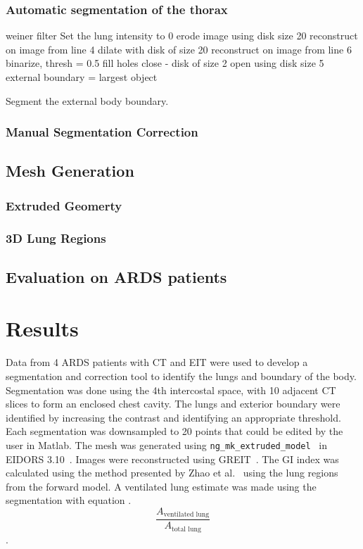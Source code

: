 \subsubsection{Automatic segmentation of the thorax}
\begin{algorithm}[H]
	\SetAlgoLined
		weiner filter\;
		Set the lung intensity to 0\;
		erode image using disk size 20\;
		reconstruct on image from line 4\;
		dilate with disk of size 20\;
		reconstruct on image from line 6\;
		binarize, thresh = 0.5\;
		fill holes\;
		close - disk of size 2\;
		open using disk size 5\;
		external boundary = largest object\;
	\caption{Segment the external body boundary.}
\end{algorithm}

\subsubsection{Manual Segmentation Correction}

\subsection{Mesh Generation}
\subsubsection{Extruded Geomerty}
\subsubsection{3D Lung Regions}

\subsection{Evaluation on ARDS patients}

\section{Results}
Data from 4 ARDS patients with CT
and EIT were used to develop a segmentation 
and correction tool to identify 
the lungs and boundary of the body.  
Segmentation was done using the 4th intercostal space, 
with 10 adjacent CT 
slices to form an enclosed chest cavity. 
The lungs
and exterior boundary were identified by increasing the contrast
and identifying an appropriate threshold.
Each segmentation was downsampled to
20 points that could be edited by the user in Matlab. The 
mesh was generated using 
\verb!ng_mk_extruded_model!~\cite{Grychtol2012} in EIDORS 
3.10~\cite{Adler2019}. Images were reconstructed 
using GREIT~\cite{Adler2009}. 
The GI index was calculated using the method
presented by Zhao et al.~\cite{Zhao2009} using the lung regions from the 
forward model. A ventilated lung estimate was made using the
segmentation with equation .
\begin{equation}\label{eq:ventilated_lung_est}
	\frac{A_{\text{ventilated lung}}}{A_{\text{total lung}}}
\end{equation}.

